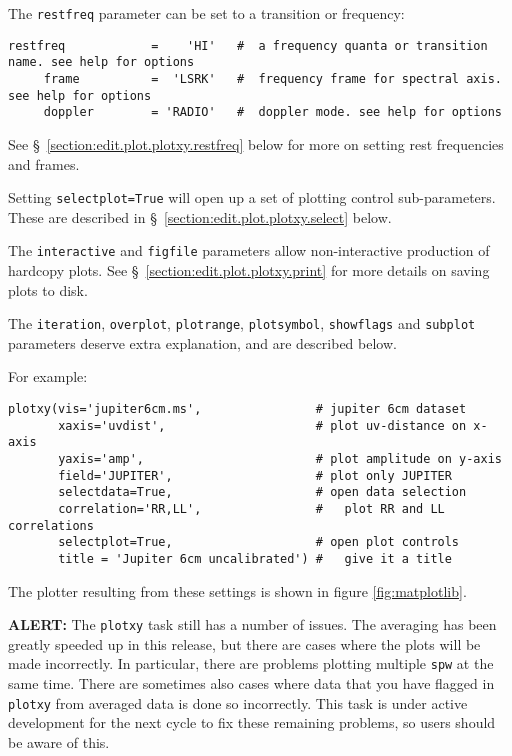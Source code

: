 The {\tt restfreq} parameter can be set to a transition or frequency:
\small
\begin{verbatim}
restfreq            =    'HI'   #  a frequency quanta or transition name. see help for options
     frame          =  'LSRK'   #  frequency frame for spectral axis. see help for options
     doppler        = 'RADIO'   #  doppler mode. see help for options
\end{verbatim}
\normalsize
See \S~\ref{section:edit.plot.plotxy.restfreq} below for more on setting rest
frequencies and frames.

Setting {\tt selectplot=True} will open up a set of plotting control
sub-parameters.  
These are described in \S~\ref{section:edit.plot.plotxy.select} below.

The {\tt interactive} and {\tt figfile} parameters allow
non-interactive production of hardcopy plots.  See
\S~\ref{section:edit.plot.plotxy.print} for more details on saving plots to disk.

The {\tt iteration}, {\tt overplot}, {\tt plotrange}, 
{\tt plotsymbol}, {\tt showflags} and {\tt subplot}
parameters deserve extra explanation, and are described below.

For example:
\small
\begin{verbatim}
plotxy(vis='jupiter6cm.ms',                # jupiter 6cm dataset
       xaxis='uvdist',                     # plot uv-distance on x-axis
       yaxis='amp',                        # plot amplitude on y-axis
       field='JUPITER',                    # plot only JUPITER
       selectdata=True,                    # open data selection
       correlation='RR,LL',                #   plot RR and LL correlations
       selectplot=True,                    # open plot controls
       title = 'Jupiter 6cm uncalibrated') #   give it a title 
\end{verbatim}
\normalsize
The plotter resulting from these settings is shown in figure \ref{fig:matplotlib}.  

{\bf ALERT:} The {\tt plotxy} task still has a number of issues.
The averaging has been greatly speeded up in this release, but there
are cases where the plots will be made incorrectly.  In particular,
there are problems plotting multiple {\tt spw} at the same time.
There are sometimes also cases where data that you have flagged in 
{\tt plotxy} from averaged data is done so incorrectly.  This task is
under active development for the next cycle to fix these remaining 
problems, so users should be aware of this.

